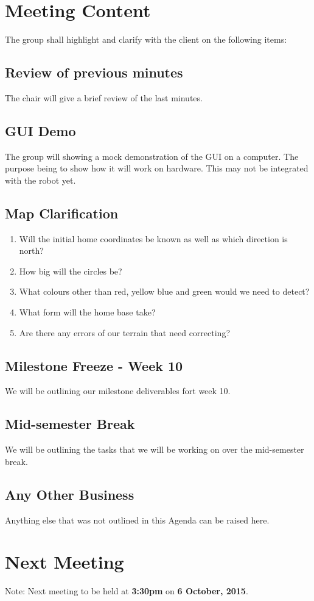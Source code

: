 \documentclass[a4paper] {article}
\begin{document}
	\section{Meeting Content}
	The group shall highlight and clarify with the client on the following items:
	
	\subsection{Review of previous minutes}
   	The chair will give a brief review of the last minutes.
	
	\subsection{GUI Demo}
	The group will showing a mock demonstration of the GUI on a computer. The purpose being to show how it will work on hardware. This may not be integrated with the robot yet.
   
    \subsection{Map Clarification}
    \begin{enumerate}
            \item Will the initial home coordinates be known as well as which direction is north?
            \item How big will the circles be?
            \item What colours other than red, yellow blue and green would we need to detect?
            \item What form will the home base take?
            \item Are there any errors of our terrain that need correcting?
        \end{enumerate}
     \subsection{Milestone Freeze - Week 10}
     We will be outlining our milestone deliverables fort week 10.
     
     \subsection{Mid-semester Break}
     We will be outlining the tasks that we will be working on over the mid-semester break.
     
     \subsection{Any Other Business}
     Anything else that was not outlined in this Agenda can be raised here.
	\section{Next Meeting}
	Note: Next meeting to be held at \textbf{3:30pm} on \textbf {6 October, 2015}. 
	
\end{document}
